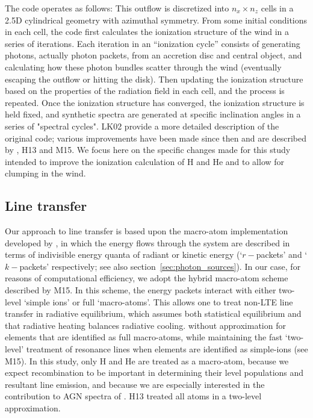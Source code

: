 \documentclass[useAMS,usenatbib]{mn2e_x}
\begin{document}
The code operates as follows:   This outflow is discretized into $n_x \times n_z$ cells in a 2.5D
cylindrical geometry with azimuthal symmetry. From some initial conditions in each cell, the code first calculates the ionization structure of the wind in a series of iterations.  Each iteration in an ``ionization cycle'' consists of generating photons, actually photon packets, from an accretion disc
and central object, and calculating how these photon bundles scatter through the wind (eventually escaping the outflow or hitting the disk). Then updating the ionization structure based on the properties of the radiation field in each cell, and the process is repeated.   Once the ionization structure has converged, the ionization structure is held fixed, and  synthetic spectra are generated at specific inclination angles in a series of "spectral cycles". LK02 provide a more detailed  description of the original code; various improvements have been made since then and are described by \cite{simmacro2005}, H13 and M15.  
We focus here on the specific changes made for this study intended to improve the ionization calculation of H and He
and to allow for clumping in the wind.


\subsection{Line transfer}

Our approach to line transfer is based upon the macro-atom implementation developed by 
\cite{lucy2002, lucy2003}, in which the energy flows through the system are described in 
terms of indivisible energy quanta of radiant or kinetic energy 
(`$r-$packets' and `$k-$packets' respectively; see also section~\ref{sec:photon_sources}). 
In our case, for reasons of computational efficiency, we adopt the  hybrid macro-atom scheme 
described by M15.
In this scheme, the energy packets interact with either two-level `simple ions' 
or full `macro-atoms'. This allows one to treat non-LTE line transfer in radiative equilibrium, which assumes both statistical equilibrium and that 
radiative heating balances radiative cooling.
without approximation for elements that are identified as 
full macro-atoms, while maintaining the fast `two-level' 
treatment of resonance lines when elements are identified 
as simple-ions (see M15). In this study,
only H and He are treated as a macro-atom, because 
we expect recombination to be important
in determining their level populations and resultant line emission, 
and because we are especially interested in the contribution to 
AGN spectra of \LA.  
H13 treated all atoms in a two-level approximation.  
\end{document}
